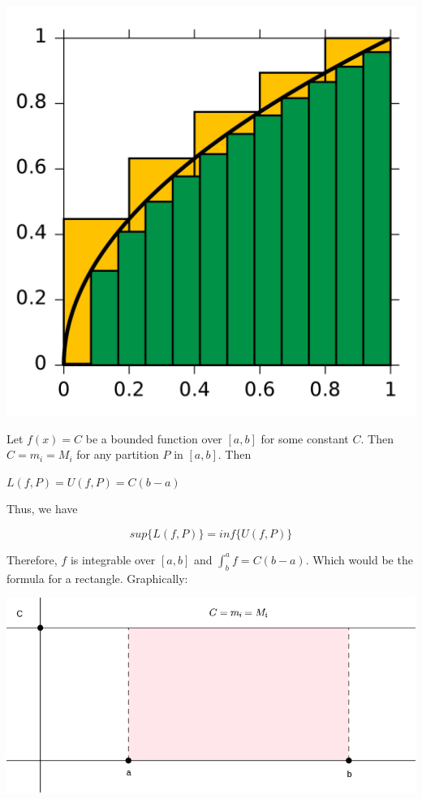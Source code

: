 \documentclass{report}
\begin{document}
    \begin{Figure}
        \begin{center}
        \includegraphics[width=.5\textwidth]{images/darbouxintegral.png}
        \end{center}
    \end{Figure}

    \begin{Example}
        Let $f(x) = C$ be a bounded function over $[a,b ]$ for some constant $C$. Then $C = m_i = M_i$ for any partition $P$ in $[a,b]$. Then

        $L(f, P) = U(f, P) = C(b-a)$

        Thus, we have

        $$sup\{L(f, P)\} = inf\{U(f, P)\}$$

        Therefore, $f$ is integrable over $[a,b]$ and $\int_{b}^{a}f = C(b-a)$. Which would be the formula for a rectangle. Graphically:

        \begin{center}
            \includegraphics[width=1\textwidth]{images/integralconstant.png}
        \end{center}
    \end{Example}

    \begin{Example}

    \end{Example}
\end{document}
